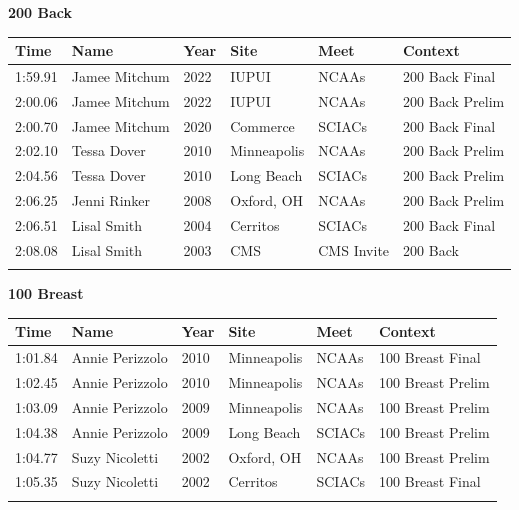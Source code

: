 \noindent\begin{minipage}[t]{0.98\textwidth}
\centering
\textbf{\textcolor{teamprimary}{200 Back}}\par
\vspace{0.5em}
\centering
\small
\renewcommand{\arraystretch}{1.0}
\setlength{\tabcolsep}{4pt}
\begin{tabular}{@{}p{2.0cm}p{3.2cm}p{1.2cm}p{2.0cm}p{2.0cm}p{2.5cm}@{}}
\toprule
\textbf{Time} & \textbf{Name} & \textbf{Year} & \textbf{Site} & \textbf{Meet} & \textbf{Context} \\
\midrule
1:59.91 & Jamee Mitchum & 2022 & IUPUI & NCAAs & 200 Back Final \\
2:00.06 & Jamee Mitchum & 2022 & IUPUI & NCAAs & 200 Back Prelim \\
2:00.70 & Jamee Mitchum & 2020 & Commerce & SCIACs & 200 Back Final \\
2:02.10 & Tessa Dover & 2010 & Minneapolis & NCAAs & 200 Back Prelim \\
2:04.56 & Tessa Dover & 2010 & Long Beach & SCIACs & 200 Back Prelim \\
2:06.25 & Jenni Rinker & 2008 & Oxford, OH & NCAAs & 200 Back Prelim \\
2:06.51 & Lisal Smith & 2004 & Cerritos & SCIACs & 200 Back Final \\
2:08.08 & Lisal Smith & 2003 & CMS & CMS Invite & 200 Back \\
\bottomrule
\vspace{0.5em}
\end{tabular}
\end{minipage}
\vspace{1.2em}
\noindent\begin{minipage}[t]{0.98\textwidth}
\centering
\textbf{\textcolor{teamprimary}{100 Breast}}\par
\vspace{0.5em}
\centering
\small
\renewcommand{\arraystretch}{1.0}
\setlength{\tabcolsep}{4pt}
\begin{tabular}{@{}p{2.0cm}p{3.2cm}p{1.2cm}p{2.0cm}p{2.0cm}p{2.5cm}@{}}
\toprule
\textbf{Time} & \textbf{Name} & \textbf{Year} & \textbf{Site} & \textbf{Meet} & \textbf{Context} \\
\midrule
1:01.84 & Annie Perizzolo & 2010 & Minneapolis & NCAAs & 100 Breast Final \\
1:02.45 & Annie Perizzolo & 2010 & Minneapolis & NCAAs & 100 Breast Prelim \\
1:03.09 & Annie Perizzolo & 2009 & Minneapolis & NCAAs & 100 Breast Prelim \\
1:04.38 & Annie Perizzolo & 2009 & Long Beach & SCIACs & 100 Breast Prelim \\
1:04.77 & Suzy Nicoletti & 2002 & Oxford, OH & NCAAs & 100 Breast Prelim \\
1:05.35 & Suzy Nicoletti & 2002 & Cerritos & SCIACs & 100 Breast Final \\
\bottomrule
\vspace{0.5em}
\end{tabular}
\end{minipage}
